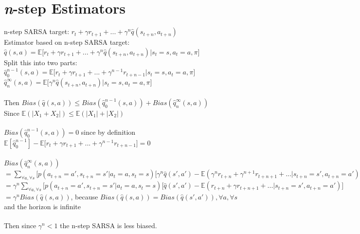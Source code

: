 \documentclass[10pt,a4paper]{article}
\begin{document}
  \section{\emph{n}-step Estimators}
  
  n-step SARSA target: 
  $r_t + \gamma r_{t+1}+...+\gamma^n\hat{q}(s_{t+n}, a_{t+n})$ \\
  Estimator based on n-step SARSA target: \\
  $\hat{q}(s, a) = \mathds{E}\big[r_t + \gamma r_{t+1}+...+\gamma^n\hat{q}(s_{t+n}, a_{t+n})\big | s_t=s,a_t=a,\pi]$ \\
  Split this into two parts: \\
  $\hat{q}_0^{n-1}(s,a)= \mathds{E}\big[r_t + \gamma r_{t+1}+...+\gamma^{n-1}r_{t+n-1}\big | s_t=s,a_t=a,\pi]$ \\
  $\hat{q}_n^{\infty}(s, a) = \mathds{E}\big[\gamma^n\hat{q}(s_{t+n}, a_{t+n})\big | s_t=s,a_t=a,\pi]$ \\
  \\
  Then $Bias(\hat{q}(s,a)) \leq Bias(\hat{q}_0^{n-1}(s,a)) + Bias(\hat{q}_n^{\infty}(s,a))$ \\
  Since $\mathds{E}(|X_1+X_2|) \leq \mathds{E}(|X_1|+|X_2|)$ \\
  \\
  $Bias(\hat{q}_0^{n-1}(s,a))=0$ since by definition \\
  $\mathds{E}[\hat{q}_0^{n-1}]-\mathds{E}\big[r_t + \gamma r_{t+1}+...+\gamma^{n-1}r_{t+n-1}\big] = 0$ \\
  \\
  $Bias(\hat{q}_n^{\infty}(s,a))$ \\
  $= \sum_{\forall a, \forall s}\big[p(a_{t+n}{=}a',s_{t+n}{=}s'|a_t{=}a,s_t{=}s)[\gamma^n\hat{q}(s',a')-\mathds{E}(\gamma^nr_{t+n}+\gamma^{n+1}r_{t+n+1}+...|s_{t+n}{=}s',a_{t+n}{=}a')\big]$ \\
  $ = \gamma^n\sum_{\forall a, \forall s}\big[p(a_{t+n}{=}a',s_{t+n}{=}s'|a_t{=}a,s_t{=}s)[\hat{q}(s',a')-\mathds{E}(r_{t+n}+\gamma r_{t+n+1}+...|s_{t+n}{=}s',a_{t+n}{=}a')\big]$
  $ = \gamma^nBias(\hat{q}(s,a))$, because $Bias(\hat{q}(s,a))=Bias(\hat{q}(s',a')), \forall a, \forall s$ and  the horizon is infinite \\
  \\
  Then since $\gamma^n < 1$ the n-step SARSA is less biased.
  
  
\end{document}
